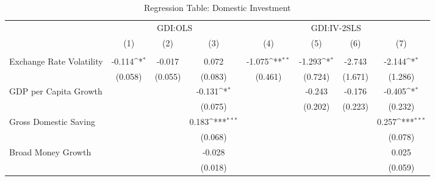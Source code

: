 \begin{table}[H] \def\sym#1{\ifmmode^{#1}\else\(^{#1}\)\fi} \caption{Regression Table: Domestic Investment} \begin{adjustbox}{max width=\textwidth} \begin{tabular}{l*{7}{c}} \\ \hline\hline
            &\multicolumn{3}{c}{GDI:OLS}                                      &\multicolumn{4}{c}{GDI:IV-2SLS}                                                        \\\cmidrule(lr){2-4}\cmidrule(lr){5-8}
            &\multicolumn{1}{c}{(1)}         &\multicolumn{1}{c}{(2)}         &\multicolumn{1}{c}{(3)}         &\multicolumn{1}{c}{(4)}         &\multicolumn{1}{c}{(5)}         &\multicolumn{1}{c}{(6)}         &\multicolumn{1}{c}{(7)}         \\
\hline \addlinespace \multicolumn{7}{l}{} \\  \addlinespace[2pt]
Exchange Rate Volatility&      -0.114\sym{*}  &      -0.017         &       0.072         &      -1.075\sym{**} &      -1.293\sym{*}  &      -2.743         &      -2.144\sym{*}  \\
            &     (0.058)         &     (0.055)         &     (0.083)         &     (0.461)         &     (0.724)         &     (1.671)         &     (1.286)         \\
\addlinespace
GDP per Capita Growth&                     &                     &      -0.131\sym{*}  &                     &      -0.243         &      -0.176         &      -0.405\sym{*}  \\
            &                     &                     &     (0.075)         &                     &     (0.202)         &     (0.223)         &     (0.232)         \\
\addlinespace
Gross Domestic Saving&                     &                     &       0.183\sym{***}&                     &                     &                     &       0.257\sym{***}\\
            &                     &                     &     (0.068)         &                     &                     &                     &     (0.078)         \\
\addlinespace
Broad Money Growth&                     &                     &      -0.028         &                     &                     &                     &       0.025         \\
            &                     &                     &     (0.018)         &                     &                     &                     &     (0.059)         \\

\end{tabular}
\end{adjustbox}
\end{table}
